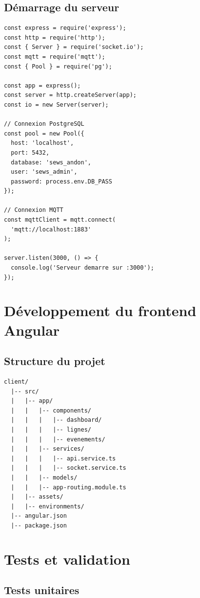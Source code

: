 \subsection{D\'emarrage du serveur}

\begin{lstlisting}[caption={D\'emarrage du serveur backend},
label={lst:server_start}]
const express = require('express');
const http = require('http');
const { Server } = require('socket.io');
const mqtt = require('mqtt');
const { Pool } = require('pg');

const app = express();
const server = http.createServer(app);
const io = new Server(server);

// Connexion PostgreSQL
const pool = new Pool({
  host: 'localhost',
  port: 5432,
  database: 'sews_andon',
  user: 'sews_admin',
  password: process.env.DB_PASS
});

// Connexion MQTT
const mqttClient = mqtt.connect(
  'mqtt://localhost:1883'
);

server.listen(3000, () => {
  console.log('Serveur demarre sur :3000');
});
\end{lstlisting}

\section{D\'eveloppement du frontend Angular}

\subsection{Structure du projet}

\begin{lstlisting}[caption={Arborescence du frontend Angular},
label={lst:client_structure}]
client/
  |-- src/
  |   |-- app/
  |   |   |-- components/
  |   |   |   |-- dashboard/
  |   |   |   |-- lignes/
  |   |   |   |-- evenements/
  |   |   |-- services/
  |   |   |   |-- api.service.ts
  |   |   |   |-- socket.service.ts
  |   |   |-- models/
  |   |   |-- app-routing.module.ts
  |   |-- assets/
  |   |-- environments/
  |-- angular.json
  |-- package.json
\end{lstlisting}

\section{Tests et validation}

\subsection{Tests unitaires}

